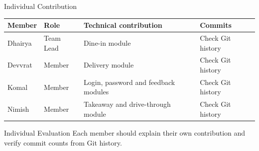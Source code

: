 \documentclass[aspectratio=169,10pt]{beamer}
\begin{document}
\begin{frame}{Individual Contribution}
\scriptsize
\begin{center}
\renewcommand{\arraystretch}{1.4}
\begin{tabularx}{.96\textwidth}{@{}p{2.0cm}p{2.0cm}X p{1.6cm}@{}}
\toprule
Member & Role & Technical contribution & Commits\\
\midrule
Dhairya & Team Lead & Dine-in module & Check Git history\\
Devvrat & Member & Delivery module & Check Git history\\
Komal & Member & Login, password and feedback modules & Check Git history\\
Nimish & Member & Takeaway and drive-through module & Check Git history\\
\bottomrule
\end{tabularx}
\end{center}
\vspace{3mm}
\begin{block}{Individual Evaluation}
Each member should explain their own contribution and verify commit counts from Git history.
\end{block}
\end{frame}
\end{document}
